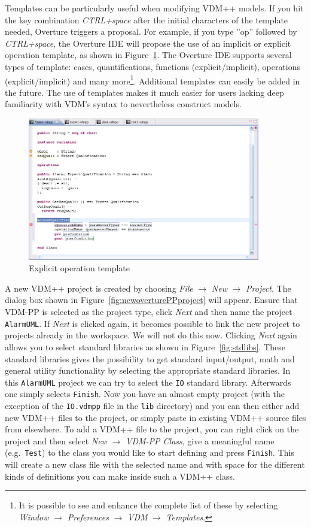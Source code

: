 Templates can be particularly useful when modifying VDM++ models. If you hit the key combination \textit{CTRL+space} after the initial characters of the template needed, Overture triggers a proposal. For example, if you type ''op'' followed by \textit{CTRL+space}, the Overture IDE will propose the use of an implicit or explicit operation template, as shown in Figure~\ref{fig:operationTemplate}. The Overture IDE supports several types of template: cases, quantifications, functions (explicit/implicit), operations (explicit/implicit) and many more\footnote{It is possible to see and enhance the complete list of these by selecting \emph{Window} $\rightarrow$ \emph{Preferences} $\rightarrow$ \emph{VDM}  $\rightarrow$ \emph{Templates}.}.  Additional templates can easily be added in the future. The use of templates makes it much easier for users lacking deep familiarity with VDM's syntax to nevertheless construct models.
%
\begin{figure}
	\begin{center}
	\includegraphics[width=4in]{figures/OperationTemplate}
	\caption{Explicit operation template}
	\label{fig:operationTemplate}
	\end{center}
\end{figure}
%
A new VDM++ project is created by choosing \emph{File} $ \rightarrow$ \emph{New} $\rightarrow$ \emph{Project}. The dialog box shown in Figure~\ref{fig:newoverturePPproject} will appear. Ensure that VDM-PP is selected as the project type, click \emph{Next} and then name the project \texttt{AlarmUML}. If \emph{Next} is clicked again, it becomes possible to link the new project to projects already in the workspace.  We will not do this now.  Clicking \emph{Next} again allows you to select standard libraries as shown in Figure~\ref{fig:stdlibs}. These standard libraries gives the possibility to get standard input/output, math and general utility functionality by selecting the appropriate standard libraries. In this \texttt{AlarmUML} project we can try to select the \texttt{IO} standard library. Afterwards one simply selects \texttt{Finish}. Now you have an almost empty project (with the exception of the \texttt{IO.vdmpp} file in the \texttt{lib} directory) and you can then either add new VDM++ files to the project, or simply paste in existing VDM++ source files from elsewhere. To add a VDM++ file to the project, you can right click on the project and then select \emph{New} $\rightarrow$ \emph{VDM-PP Class}, give a meaningful name (e.g.\ \texttt{Test}) to the class you would like to start defining and press \texttt{Finish}. This will create a new class file with the selected name and with space for the different kinds of definitions you can make inside such a VDM++ class.
